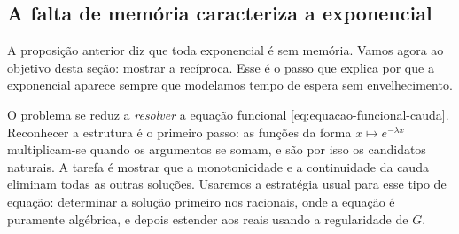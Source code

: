 \subsection{A falta de memória caracteriza a exponencial}

A proposição anterior diz que toda exponencial é sem memória. Vamos agora ao
objetivo desta seção: mostrar a recíproca. Esse é o passo que explica
por que a exponencial aparece sempre que modelamos tempo de espera sem
envelhecimento.

O problema se reduz a \emph{resolver} a equação funcional
\eqref{eq:equacao-funcional-cauda}. Reconhecer a estrutura é o primeiro
passo: as funções da forma $x\mapsto e^{-\lambda x}$ multiplicam-se quando os
argumentos se somam, e são por isso os candidatos naturais. A tarefa é
mostrar que a monotonicidade e a continuidade da cauda eliminam todas as
outras soluções. Usaremos a estratégia usual para esse tipo de equação:
determinar a solução primeiro nos racionais, onde a equação é puramente
algébrica, e depois estender aos reais usando a regularidade de $G$.

